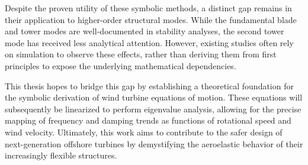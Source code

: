 \documentclass[onecolumn,draftcls]{IEEEtran}
\begin{document}
Despite the proven utility of these symbolic methods, a distinct gap remains in their application to higher-order structural modes. While the fundamental blade and tower modes are well-documented in stability analyses, the second tower mode has received less analytical attention. However, existing studies often rely on simulation to observe these effects, rather than deriving them from first principles to expose the underlying mathematical dependencies.

This thesis hopes to bridge this gap by establishing a theoretical foundation for the symbolic derivation of wind turbine equations of motion. These equations will subsequently be linearized to perform eigenvalue analysis, allowing for the precise mapping of frequency and damping trends as functions of rotational speed and wind velocity. Ultimately, this work aims to contribute to the safer design of next-generation offshore turbines by demystifying the aeroelastic behavior of their increasingly flexible structures.

\newpage

\end{document}
